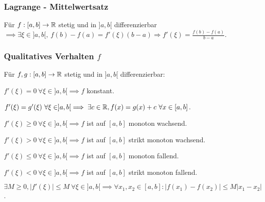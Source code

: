 \subsubsection{Lagrange - Mittelwertsatz}
Für $f:[a,b] \to \mathbb{R}$ stetig und in $]a,b[$ differenzierbar $\implies \exists \xi \in ]a,b[, \ f(b) - f(a) = f'(\xi)(b - a) \Rightarrow f'(\xi) = \frac{f(b) - f(a)}{b - a}$.

\subsubsection{Qualitatives Verhalten $f$}
Für $f,g: [a,b] \to \mathbb{R}$ stetig und in $]a, b[$ differenzierbar:
\begin{compactenum}
    \item $f'(\xi) = 0 \ \forall \xi \in ]a, b[ \implies f$ konstant.
    \item $f'(\xi) = g'(\xi) \ \forall \xi \in ]a, b[ \implies \exists c \in \mathbb{R}, f(x) = g(x) + c \ \forall x \in [a,b]$.
    \item $f'(\xi) \ge 0 \ \forall \xi \in ]a, b[ \implies f$ ist auf $[a,b]$ monoton wachsend.
    \item $f'(\xi) > 0 \ \forall \xi \in ]a, b[ \implies f$ ist auf $[a,b]$ strikt monoton wachsend.
    \item $f'(\xi) \le 0 \ \forall \xi \in ]a, b[ \implies f$ ist auf $[a,b]$ monoton fallend.
    \item $f'(\xi) < 0 \ \forall \xi \in ]a, b[ \implies f$ ist auf $[a,b]$ strikt monoton fallend.
    \item $\exists M \ge 0, |f'(\xi)| \le M \ \forall \xi \in ]a,b[ \implies \forall x_1, x_2 \in [a,b] : |f(x_1) - f(x_2)| \le M|x_1 - x_2|$.
\end{compactenum}

